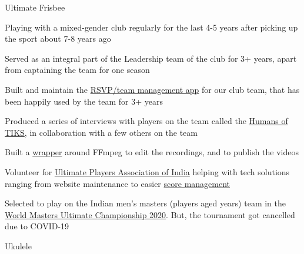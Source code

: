 
\begin{cventries}
  \cventry
      {Ultimate Frisbee }
      {}
      {} %
      {} %
      {
        \begin{cvitems} %
        \item {Playing with a mixed-gender club regularly for the last 4-5 years after picking up the sport about 7-8 years ago}
        \item {Served as an integral part of the Leadership team of the club for 3+ years, apart from captaining the team for one season}
        \item {Built and maintain the \href{https://rsvp.thatteidlikaalsoup.team/features}{RSVP/team management app} for our club team, that has been happily used by the team for 3+ years}
        \item {Produced a series of interviews with players on the team called the \href{https://www.instagram.com/tiks_ultimate/channel/}{Humans of TIKS}, in collaboration with a few others on the team}
        \item {Built a \href{https://github.com/thatte-idli-kaal-soup/humans}{wrapper} around FFmpeg to edit the recordings, and to publish the videos}
        \item {Volunteer for \href{https://indiaultimate.org}{Ultimate Players Association of India} helping with tech solutions ranging from website maintenance to easier \href{https://sotg.indiaultimate.org/about}{score management}}
        \item {Selected to play on the Indian men's masters (players aged  years) team in the \href{https://wmuc2020.com/}{World Masters Ultimate Championship 2020}. But, the tournament got cancelled due to COVID-19}
        \end{cvitems}
      }
  \cventry
      {Ukulele \faGuitar}
      {}
      {} %

\end{cventries}
